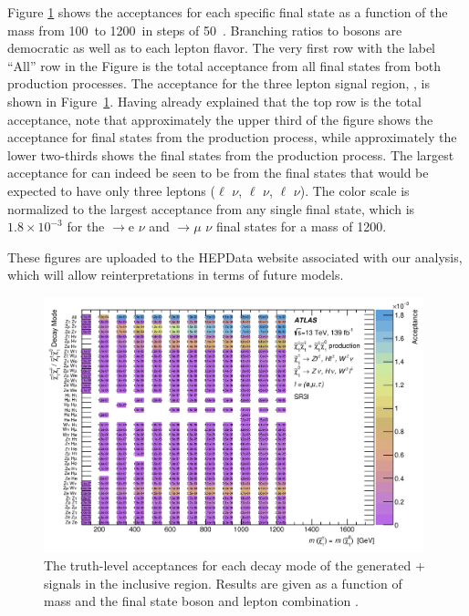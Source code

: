 Figure \ref{fig:AccSR3l} shows the acceptances for each specific final state as a function of the \chono mass from 100~\gev to 1200~\gev in steps of 50~\gev.
Branching ratios to bosons are democratic as well as to each lepton flavor.
The very first row with the label ``All'' row in the Figure is the total acceptance from all final states from both production processes.
The acceptance for the three lepton signal region, \SRThree, is shown in Figure~\ref{fig:AccSR3l}.
Having already explained that the top row is the total acceptance, note that approximately the upper third of the figure shows the acceptance for final states from the \CNsignal production process, while approximately the lower two-thirds shows  the final states from the \CCsignal production process.
The largest acceptance for \SRThree can indeed be seen to be from the final states that would be expected to have only three leptons (\Zboson$\ell$ \Zboson$\nu$, \Zboson$\ell$ \Hboson $\nu$, \Zboson$\ell$ \Wboson$\nu$).
The color scale is normalized to the largest acceptance from any single final state, which is $1.8 \times 10^{-3}$ for the \CNsignal$\rightarrow$\Zboson e \Zboson $\nu$ and \CNsignal$\rightarrow$\Zboson $\mu$ \Zboson $\nu$ final states for a \chone mass of 1200\GeV.

These figures are uploaded to the HEPData website associated with our analysis, which will allow reinterpretations in terms of future models.
\begin{figure}[tbp]
  \begin{center}
    \includegraphics[width=0.98\textwidth]{figs/rpvthreel/MC_Acc_MassvsProcess_SROL3l_emutau.png}
  \end{center}
  \caption[Signal acceptance by process in \SRThree]
          {The truth-level acceptances for each decay mode of the generated \CCsignal + \CNsignal signals in the inclusive \SRThree region. Results are given as a function of \chono mass and the final state boson and lepton combination \cite{ATLAS:2020uer}.}
          \label{fig:AccSR3l}
\end{figure}

